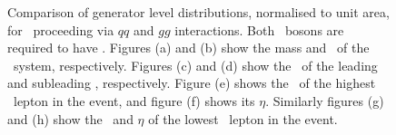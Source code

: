 \begin{figure}
{    }
        \vspace{-2mm}
        \vspace{-2mm}
    \caption[Comparison of generator level distributions, normalised to
    unit area, for \ZZllll\ proceeding via $qq$ and $gg$ interactions.]{\small Comparison of generator level distributions, normalised to
    unit area, for \ZZllll\ proceeding via $qq$ and $gg$ interactions. Both \Z\
    bosons are required to have \sstooosZ. Figures (a)
    and (b) show the mass and \pt\ of the \ZZ\ system,
    respectively. Figures (c) and (d) show the \pt\ of the
    leading and subleading \Z, respectively. Figure (e) shows the \pt\ of the highest \pt\ lepton in the event, and figure (f) shows its
   $\eta$. Similarly figures (g) and (h) show the \pt\ and $\eta$ of the lowest
   \pt\ lepton in the event.}
    \label{fig:gen-comp-gg-qq-ZZ}
\end{figure}

